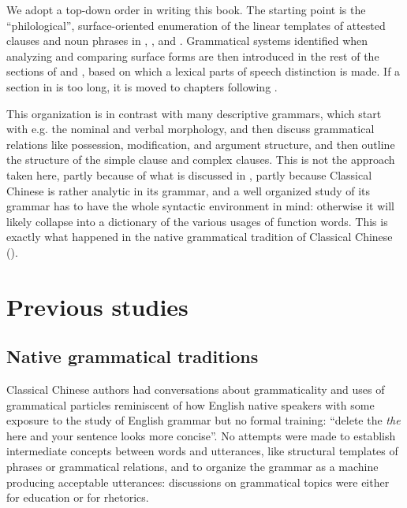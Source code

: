 \documentclass[UTF8, a4paper, oneside, scheme=plain, 12pt]{ctexrep}
\newcommand{\form}[1]{\emph{#1}}
\begin{document}
We adopt a top-down order in writing this book.
The starting point is the ``philological'', surface-oriented enumeration of the linear templates of attested clauses and noun phrases in , , and .
Grammatical systems identified when analyzing and comparing surface forms
are then introduced in the rest of the sections of  and ,
based on which a lexical parts of speech distinction is made.
If a section in  is too long,
it is moved to chapters following .

This organization is in contrast with many descriptive grammars,
which start with e.g. the nominal and verbal morphology,
and then discuss grammatical relations like possession, modification, and argument structure,
and then outline the structure of the simple clause and complex clauses.
This is not the approach taken here,
partly because of what is discussed in ,
partly because Classical Chinese is rather analytic in its grammar,
and a well organized study of its grammar has to have the whole syntactic environment in mind:
otherwise it will likely collapse into a dictionary of the various usages of function words.
This is exactly what happened in the native grammatical tradition of Classical Chinese
().

\section{Previous studies}

\subsection{Native grammatical traditions}\label{sec:introduction.previous.tradition}

Classical Chinese authors had conversations about grammaticality 
and uses of grammatical particles
reminiscent of how English native speakers
with some exposure to the study of English grammar but no formal training:
``delete the \form{the} here and your sentence looks more concise''.
No attempts were made to establish intermediate concepts between words and utterances,
like structural templates of phrases or grammatical relations, 
and to organize the grammar as a machine producing acceptable utterances:
discussions on grammatical topics were either for education or for rhetorics.
\end{document}
